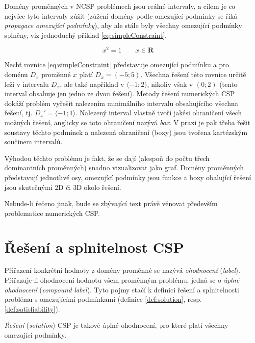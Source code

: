 Domény proměnných v NCSP problémech jsou reálné intervaly, a cílem je co nejvíce tyto intervaly zúžit (zúžení domény podle omezující podmínky se říká \emph{propagace omezující podmínky}), aby ale stále byly všechny omezující podmínky splněny, viz jednoduchý příklad \ref{eq:simpleConstraint}.

\begin{equation} \label{eq:simpleConstraint}
x^2 = 1\qquad x \in \boldsymbol{R}
\end{equation}

Nechť rovnice \ref{eq:simpleConstraint} představuje omezující podmínku a pro doménu $D_x$ proměnné $x$ platí $D_x = (-5;5)$. Všechna řešení této rovnice určitě leží v intervalu $D_x$, ale také například v $\langle -1;2)$, nikoliv však v $(0;2)$ (tento interval obsahuje jen jedno ze dvou řešení). Metody řešení numerických CSP dokáží problém vyřešit nalezením minimálního intervalu obsahujícího všechna řešení, tj. $D_x' = \langle -1;1\rangle$. Nalezený interval vlastně tvoří jakési ohraničení všech možných řešení, anglicky se toto ohraničení nazývá \emph{box}. V praxi je pak třeba řešit soustavy těchto podmínek a nalezená ohraničení (boxy) jsou tvořena kartézským součinem intervalů.

Výhodou těchto problému je fakt, že se dají (alespoň do počtu třech dominantních proměnných) snadno vizualizovat jako graf. Domény proměnných představují jednotlivé osy, omezující podmínky jsou funkce a boxy obalující řešení jsou skutečnými 2D či 3D  okolo řešení.

Nebude-li řečeno jinak, bude se zbývající text právě věnovat především problematice numerických CSP.






\section{Řešení a splnitelnost CSP}
Přiřazení konkrétní hodnoty z domény proměnné se nazývá \emph{ohodnocení} (\emph{label}). Přiřazuje-li ohodnocení hodnotu všem proměnným problému, jedná se o \emph{úplné ohodnocení} (\emph{compound label}). Tyto pojmy stačí k definici řešení a splnitelnosti problému s omezujícími podmínkami (definice \ref{def:solution}, resp. \ref{def:satisfiability}).

\begin{definition}
\label{def:solution}
\emph{Řešení} (\emph{solution}) CSP je takové úplné ohodnocení, pro které platí všechny omezující podmínky.
\end{definition}

